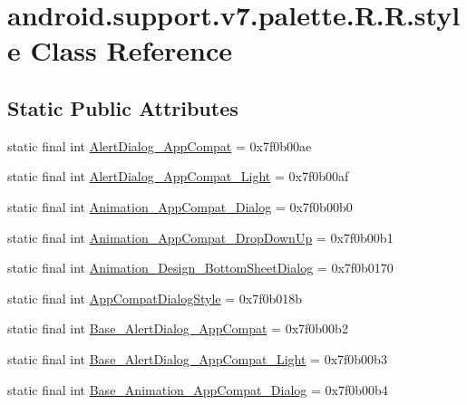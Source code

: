 \hypertarget{classandroid_1_1support_1_1v7_1_1palette_1_1_r_1_1style}{
\section{android.support.v7.palette.R.R.style Class Reference}
\label{classandroid_1_1support_1_1v7_1_1palette_1_1_r_1_1style}
}
\subsection*{Static Public Attributes}
\begin{CompactItemize}
\item 
static final int \hyperlink{classandroid_1_1support_1_1v7_1_1palette_1_1_r_1_1style_d86ba8bf22f708dd1ada21b9264ad1d6}{AlertDialog\_\-AppCompat} = 0x7f0b00ae
\item 
static final int \hyperlink{classandroid_1_1support_1_1v7_1_1palette_1_1_r_1_1style_6755331690d452067ade9fe674174f46}{AlertDialog\_\-AppCompat\_\-Light} = 0x7f0b00af
\item 
static final int \hyperlink{classandroid_1_1support_1_1v7_1_1palette_1_1_r_1_1style_7316e07c60bf6058437ceae3d5f788a2}{Animation\_\-AppCompat\_\-Dialog} = 0x7f0b00b0
\item 
static final int \hyperlink{classandroid_1_1support_1_1v7_1_1palette_1_1_r_1_1style_c10c017e4429b106e1daa8fd2ad794a0}{Animation\_\-AppCompat\_\-DropDownUp} = 0x7f0b00b1
\item 
static final int \hyperlink{classandroid_1_1support_1_1v7_1_1palette_1_1_r_1_1style_df1a42f9e29a5d30f6883f01b29bb0ac}{Animation\_\-Design\_\-BottomSheetDialog} = 0x7f0b0170
\item 
static final int \hyperlink{classandroid_1_1support_1_1v7_1_1palette_1_1_r_1_1style_9002d026ec4a9eb740d53cbb58c776c0}{AppCompatDialogStyle} = 0x7f0b018b
\item 
static final int \hyperlink{classandroid_1_1support_1_1v7_1_1palette_1_1_r_1_1style_562b37b77646fd93de58e0f856915f76}{Base\_\-AlertDialog\_\-AppCompat} = 0x7f0b00b2
\item 
static final int \hyperlink{classandroid_1_1support_1_1v7_1_1palette_1_1_r_1_1style_760976b1511ec846aac4ea553bba2231}{Base\_\-AlertDialog\_\-AppCompat\_\-Light} = 0x7f0b00b3
\item 
static final int \hyperlink{classandroid_1_1support_1_1v7_1_1palette_1_1_r_1_1style_b8e70e8c1da831d16b04d8d802cb2552}{Base\_\-Animation\_\-AppCompat\_\-Dialog} = 0x7f0b00b4

\end{CompactItemize}
